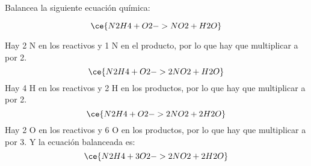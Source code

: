 Balancea la siguiente ecuación química:

\[
    \ce{N2H4 + O2 -> NO2 + H2O}
\]

\begin{solutionbox}{5cm}
    Hay 2 N en los reactivos y 1 N en el producto, por lo que hay que multiplicar a  por 2.
    \[
        \ce{N2H4 + O2 -> 2NO2 + H2O}
    \]
    Hay 4 H en los reactivos y 2 H en los productos, por lo que hay que multiplicar a  por 2.
    \[
        \ce{N2H4 + O2 -> 2NO2 + 2H2O}
    \]
    Hay 2 O en los reactivos y 6 O en los productos, por lo que hay que multiplicar a  por 3. Y la ecuación balanceada es:
    \[
        \ce{N2H4 + 3O2 -> 2NO2 + 2H2O}
    \]
\end{solutionbox}